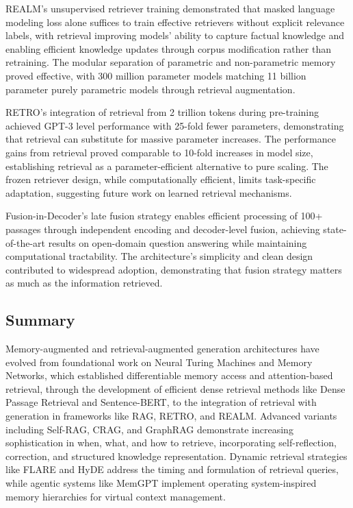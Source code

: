 \documentclass[11pt,letterpaper]{article}
\begin{document}
REALM's unsupervised retriever training demonstrated that masked language modeling loss alone suffices to train effective retrievers without explicit relevance labels, with retrieval improving models' ability to capture factual knowledge and enabling efficient knowledge updates through corpus modification rather than retraining. The modular separation of parametric and non-parametric memory proved effective, with 300 million parameter models matching 11 billion parameter purely parametric models through retrieval augmentation.

RETRO's integration of retrieval from 2 trillion tokens during pre-training achieved GPT-3 level performance with 25-fold fewer parameters, demonstrating that retrieval can substitute for massive parameter increases. The performance gains from retrieval proved comparable to 10-fold increases in model size, establishing retrieval as a parameter-efficient alternative to pure scaling. The frozen retriever design, while computationally efficient, limits task-specific adaptation, suggesting future work on learned retrieval mechanisms.

Fusion-in-Decoder's late fusion strategy enables efficient processing of 100+ passages through independent encoding and decoder-level fusion, achieving state-of-the-art results on open-domain question answering while maintaining computational tractability. The architecture's simplicity and clean design contributed to widespread adoption, demonstrating that fusion strategy matters as much as the information retrieved.

\subsection{Summary}

Memory-augmented and retrieval-augmented generation architectures have evolved from foundational work on Neural Turing Machines and Memory Networks, which established differentiable memory access and attention-based retrieval, through the development of efficient dense retrieval methods like Dense Passage Retrieval and Sentence-BERT, to the integration of retrieval with generation in frameworks like RAG, RETRO, and REALM. Advanced variants including Self-RAG, CRAG, and GraphRAG demonstrate increasing sophistication in when, what, and how to retrieve, incorporating self-reflection, correction, and structured knowledge representation. Dynamic retrieval strategies like FLARE and HyDE address the timing and formulation of retrieval queries, while agentic systems like MemGPT implement operating system-inspired memory hierarchies for virtual context management.
\end{document}
